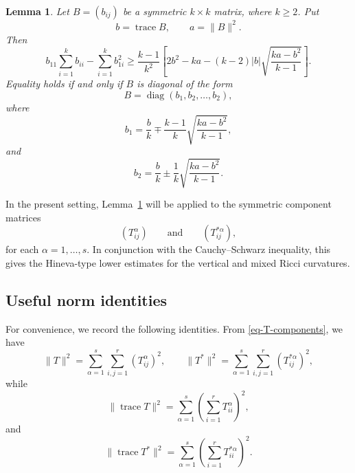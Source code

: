 \documentclass[10pt,a4paper]{article}
\newtheorem{lemma}[theorem]{Lemma}
\theoremstyle{definition}
\theoremstyle{remark}
\numberwithin{equation}{section}
\begin{document}
\begin{lemma}
\label{Hineva}
Let $B=(b_{ij})$ be a symmetric $k\times k$ matrix, where $k\geq2$.
Put
\[
b=\operatorname{trace}B,
\qquad
a=\|B\|^{2}.
\]
Then
\begin{equation}
b_{11}\sum_{i=1}^{k}b_{ii}
-
\sum_{i=1}^{k}b_{1i}^{2}
\geq
\frac{k-1}{k^{2}}
\left[
2b^{2}-ka
-(k-2)|b|
\sqrt{\frac{ka-b^{2}}{k-1}}
\right].
\label{eq-Hineva-algebraic}
\end{equation}
Equality holds if and only if $B$ is diagonal of the form
\[
B=\operatorname{diag}(b_1,b_2,\ldots,b_2),
\]
where
\begin{equation}
b_1
=
\frac{b}{k}
\mp
\frac{k-1}{k}
\sqrt{\frac{ka-b^{2}}{k-1}},
\label{eq-Hineva-b1}
\end{equation}
and
\begin{equation}
b_2
=
\frac{b}{k}
\pm
\frac{1}{k}
\sqrt{\frac{ka-b^{2}}{k-1}}.
\label{eq-Hineva-b2}
\end{equation}
\end{lemma}

In the present setting, Lemma~\ref{Hineva} will be applied to the
symmetric component matrices
\[
(T_{ij}^{\alpha})
\qquad\text{and}\qquad
(T_{ij}^{*\alpha}),
\]
for each $\alpha=1,\ldots,s$. In conjunction with the Cauchy--Schwarz
inequality, this gives the Hineva-type lower estimates for the vertical
and mixed Ricci curvatures.

\subsection{Useful norm identities}

For convenience, we record the following identities. From
\eqref{eq-T-components}, we have
\begin{equation}
\|T\|^{2}
=
\sum_{\alpha=1}^{s}
\sum_{i,j=1}^{r}
(T_{ij}^{\alpha})^{2},
\qquad
\|T^{*}\|^{2}
=
\sum_{\alpha=1}^{s}
\sum_{i,j=1}^{r}
(T_{ij}^{*\alpha})^{2},
\label{eq-T-norm-final}
\end{equation}
while
\begin{equation}
\|\operatorname{trace}T\|^{2}
=
\sum_{\alpha=1}^{s}
\left(
\sum_{i=1}^{r}T_{ii}^{\alpha}
\right)^{2},
\label{eq-traceT-norm}
\end{equation}
and
\begin{equation}
\|\operatorname{trace}T^{*}\|^{2}
=
\sum_{\alpha=1}^{s}
\left(
\sum_{i=1}^{r}T_{ii}^{*\alpha}
\right)^{2}.
\label{eq-traceTstar-norm}
\end{equation}
\end{document}
